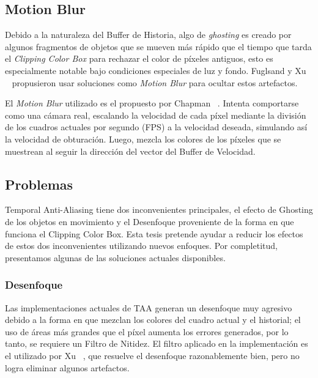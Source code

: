 \documentclass[pregrado]{tesis-usb} %
\begin{document}
\subsection{Motion Blur}
Debido a la naturaleza del Buffer de Historia, algo de \textit{ghosting} es creado por algunos fragmentos de objetos que se mueven más rápido que el tiempo que tarda el \textit{Clipping Color Box} para rechazar el color de píxeles antiguos, esto es especialmente notable bajo condiciones especiales de luz y fondo. Fuglsand y Xu ~\cite{Fuglsand2016, XU2016} propusieron usar soluciones como \textit{Motion Blur} para ocultar estos artefactos.

El \textit{Motion Blur} utilizado es el propuesto por Chapman ~\cite{Chapman2012}. Intenta comportarse como una cámara real, escalando la velocidad de cada píxel mediante la división de los cuadros actuales por segundo (FPS) a la velocidad deseada, simulando así la velocidad de obturación. Luego, mezcla los colores de los píxeles que se muestrean al seguir la dirección del vector del Buffer de Velocidad.


\subsection{Problemas}
Temporal Anti-Aliasing tiene dos inconvenientes principales, el efecto de Ghosting de los objetos en movimiento y el Desenfoque proveniente de la forma en que funciona el Clipping Color Box. Esta tesis pretende ayudar a reducir los efectos de estos dos inconvenientes utilizando nuevos enfoques. Por completitud, presentamos algunas de las soluciones actuales disponibles.

\subsubsection{Desenfoque} 
Las implementaciones actuales de TAA generan un desenfoque muy agresivo debido a la forma en que mezclan los colores del cuadro actual y el historial; el uso de áreas más grandes que el píxel aumenta los errores generados, por lo tanto, se requiere un Filtro de Nitidez. El filtro aplicado en la implementación es el utilizado por Xu ~\cite{XU2016}, que resuelve el desenfoque razonablemente bien, pero no logra eliminar algunos artefactos. 
\end{document}
